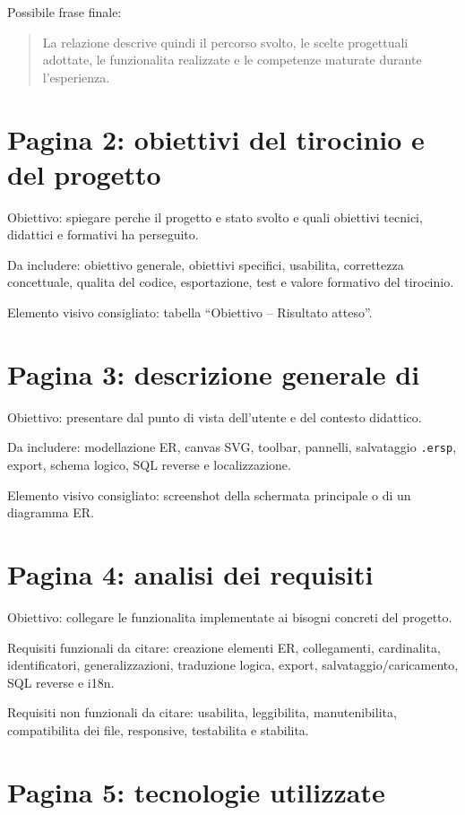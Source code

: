 Possibile frase finale:
\begin{quote}
La relazione descrive quindi il percorso svolto, le scelte progettuali adottate, le funzionalita realizzate e le competenze maturate durante l'esperienza.
\end{quote}

\section{Pagina 2: obiettivi del tirocinio e del progetto}

Obiettivo: spiegare perche il progetto e stato svolto e quali obiettivi tecnici, didattici e formativi ha perseguito.

Da includere: obiettivo generale, obiettivi specifici, usabilita, correttezza concettuale, qualita del codice, esportazione, test e valore formativo del tirocinio.

Elemento visivo consigliato: tabella ``Obiettivo -- Risultato atteso''.

\section{Pagina 3: descrizione generale di \builder}

Obiettivo: presentare \builder{} dal punto di vista dell'utente e del contesto didattico.

Da includere: modellazione ER, canvas SVG, toolbar, pannelli, salvataggio \texttt{.ersp}, export, schema logico, SQL reverse e localizzazione.

Elemento visivo consigliato: screenshot della schermata principale o di un diagramma ER.

\section{Pagina 4: analisi dei requisiti}

Obiettivo: collegare le funzionalita implementate ai bisogni concreti del progetto.

Requisiti funzionali da citare: creazione elementi ER, collegamenti, cardinalita, identificatori, generalizzazioni, traduzione logica, export, salvataggio/caricamento, SQL reverse e i18n.

Requisiti non funzionali da citare: usabilita, leggibilita, manutenibilita, compatibilita dei file, responsive, testabilita e stabilita.

\section{Pagina 5: tecnologie utilizzate}

